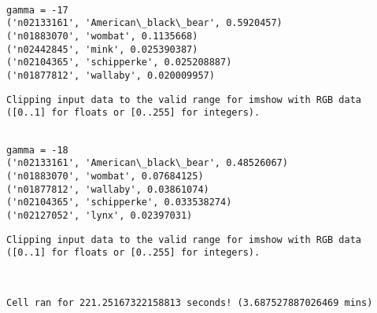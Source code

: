 \documentclass[11pt]{article}
\begin{document}
    \begin{Verbatim}[commandchars=\\\{\}]

gamma = -17
('n02133161', 'American\_black\_bear', 0.5920457)
('n01883070', 'wombat', 0.1135668)
('n02442845', 'mink', 0.025390387)
('n02104365', 'schipperke', 0.025208887)
('n01877812', 'wallaby', 0.020009957)

    \end{Verbatim}

    \begin{Verbatim}[commandchars=\\\{\}]
Clipping input data to the valid range for imshow with RGB data ([0..1] for floats or [0..255] for integers).

    \end{Verbatim}

    \begin{Verbatim}[commandchars=\\\{\}]

gamma = -18
('n02133161', 'American\_black\_bear', 0.48526067)
('n01883070', 'wombat', 0.07684125)
('n01877812', 'wallaby', 0.03861074)
('n02104365', 'schipperke', 0.033538274)
('n02127052', 'lynx', 0.02397031)

    \end{Verbatim}

    \begin{Verbatim}[commandchars=\\\{\}]
Clipping input data to the valid range for imshow with RGB data ([0..1] for floats or [0..255] for integers).

    \end{Verbatim}

    \begin{center}
    \end{center}
    { \hspace*{\fill} \\}
    
    \begin{Verbatim}[commandchars=\\\{\}]
Cell ran for 221.25167322158813 seconds! (3.687527887026469 mins)

    \end{Verbatim}
\end{document}
